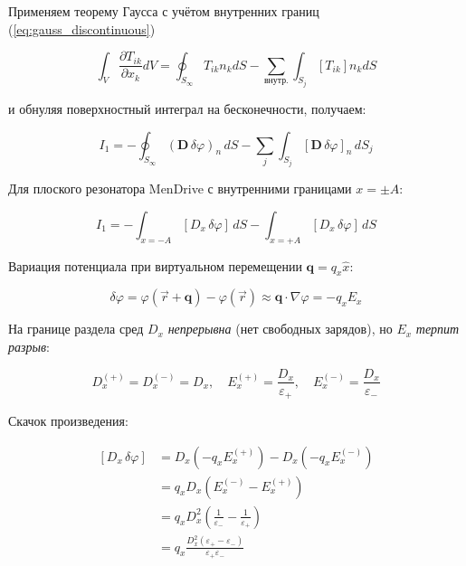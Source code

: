 \documentclass[a4paper,10pt]{article}
\newcommand{\modblock}[1]{\colorbox{modcolor!10}{\parbox{\dimexpr\linewidth-2\fboxsep}{#1}}}
\begin{document}
\modblock{

Применяем теорему Гаусса с учётом внутренних границ (\ref{eq:gauss_discontinuous})

\begin{equation}
\int_V \frac{\partial T_{ik}}{\partial x_k} dV = \oint_{S_\infty} T_{ik} n_k dS
- \sum_{\text{внутр.}} \int_{S_j} [T_{ik}] n_k dS
\label{eq:gauss_discontinuous}
\end{equation}

и обнуляя поверхностный интеграл на бесконечности, получаем:

\begin{equation}
I_1 = -\oint_{S_\infty} (\mathbf{D}\,\delta\varphi)_n\,dS
- \sum_j \int_{S_j} [\mathbf{D}\,\delta\varphi]_n\,dS_j
\label{eq:term_1_gauss}
\end{equation}

Для плоского резонатора MenDrive с внутренними границами $x = \pm A$:

\begin{equation}
I_1 = -\int_{x=-A} [D_x\,\delta\varphi]\,dS - \int_{x=+A} [D_x\,\delta\varphi]\,dS
\label{eq:term_1_mendrive}
\end{equation}

Вариация потенциала при виртуальном перемещении $\mathbf{q} = q_x\hat{x}$:

\begin{equation}
\delta\varphi = \varphi(\vec{r}+\mathbf{q}) - \varphi(\vec{r}) \approx
\mathbf{q}\cdot\nabla\varphi = -q_x E_x
\label{eq:potential_variation}
\end{equation}

На границе раздела сред $D_x$ \textit{непрерывна} (нет свободных зарядов),
но $E_x$ \textit{терпит разрыв}:

\begin{equation}
D_x^{(+)} = D_x^{(-)} = D_x, \quad
E_x^{(+)} = \frac{D_x}{\varepsilon_+}, \quad
E_x^{(-)} = \frac{D_x}{\varepsilon_-}
\label{eq:boundary_conditions_D_E}
\end{equation}
}%

\modblock{
Скачок произведения:

\begin{equation}
\begin{aligned}
[D_x\,\delta\varphi] &= D_x(-q_x E_x^{(+)}) - D_x(-q_x E_x^{(-)}) \\
&= q_x D_x (E_x^{(-)} - E_x^{(+)}) \\
&= q_x D_x^2 \left(\frac{1}{\varepsilon_-} - \frac{1}{\varepsilon_+}\right) \\
&= q_x \frac{D_x^2(\varepsilon_+ - \varepsilon_-)}{\varepsilon_+\varepsilon_-}
\end{aligned}
\label{eq:jump_D_delta_phi}
\end{equation}
}%
\end{document}
